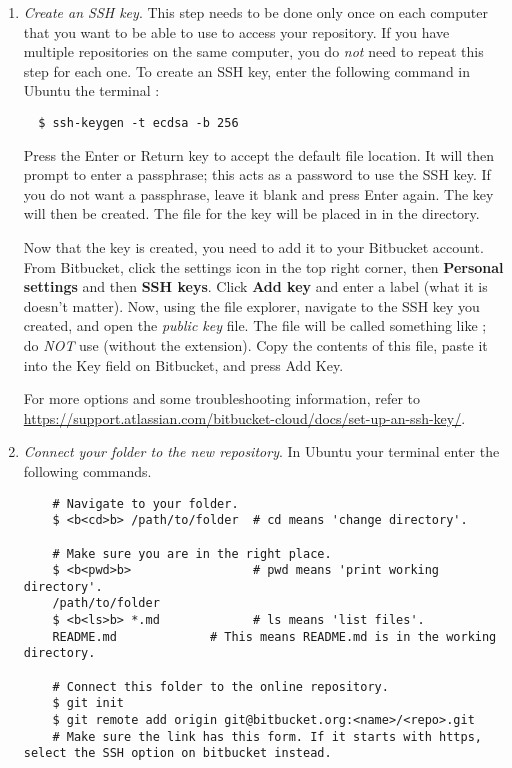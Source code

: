 \begin{enumerate}
  \item \emph{Create an SSH key}.
  This step needs to be done only once on each computer that you want to be able to use to access your repository.
  If you have multiple repositories on the same computer, you do \emph{not} need to repeat this step for each one.
  To create an SSH key, enter the following command in
  \ifwindows
  Ubuntu
  \else
  the terminal
  \fi
  :
  \begin{lstlisting}
  $ ssh-keygen -t ecdsa -b 256
  \end{lstlisting}
  Press the Enter or Return key to accept the default file location.
  It will then prompt to enter a passphrase; this acts as a password to use the SSH key.
  If you do not want a passphrase, leave it blank and press Enter again.
  The key will then be created.
  The file for the key will be placed in in the  directory.
  
  Now that the key is created, you need to add it to your Bitbucket account.
  From Bitbucket, click the settings icon in the top right corner, then \textbf{Personal settings} and then \textbf{SSH keys}.
  Click \textbf{Add key} and enter a label (what it is doesn't matter).
  Now, using the file explorer, navigate to the SSH key you created, and open the \emph{public key} file.
  The file will be called something like ; do \emph{NOT} use  (without the  extension).
  Copy the contents of this file, paste it into the Key field on Bitbucket, and press Add Key.
  
  For more options and some troubleshooting information, refer to \url{https://support.atlassian.com/bitbucket-cloud/docs/set-up-an-ssh-key/}.
  
  \item \emph{Connect your folder to the new repository}.
  \label{step:connect-folder}
  In 
  \ifwindows
  Ubuntu
  \else
  your terminal
  \fi 
  enter the following commands.
  \begin{lstlisting}
    # Navigate to your folder.
    $ <b<cd>b> /path/to/folder  # cd means 'change directory'.
    
    # Make sure you are in the right place.
    $ <b<pwd>b>                 # pwd means 'print working directory'.
    /path/to/folder
    $ <b<ls>b> *.md             # ls means 'list files'.
    README.md             # This means README.md is in the working directory.
    
    # Connect this folder to the online repository.
    $ git init
    $ git remote add origin git@bitbucket.org:<name>/<repo>.git
    # Make sure the link has this form. If it starts with https, select the SSH option on bitbucket instead.
    

\end{lstlisting}
\end{enumerate}
